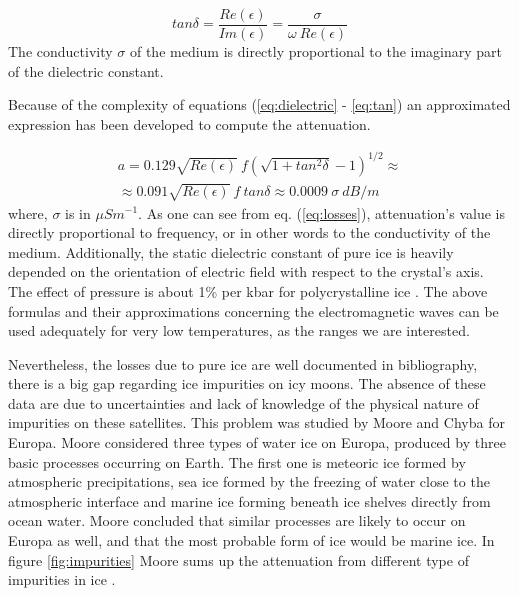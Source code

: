 \begin{equation}
    tan \delta=\frac{Re(\epsilon)}{Im(\epsilon)}=\frac{\sigma}{\omega\ Re(\epsilon)}
    \label{eq:tan}
\end{equation}
The conductivity $\sigma$ of the medium is directly proportional to the imaginary part of the dielectric constant.

Because of the complexity of equations (\ref{eq:dielectric} - \ref{eq:tan}) an approximated expression has been developed to compute the attenuation.

\begin{multline}
    a=0.129 \sqrt{Re(\epsilon)}\ f (\sqrt{1+tan^2 \delta}-1)^{1/2} \approx \\
    \approx 0.091 \sqrt{Re(\epsilon)}\ f\ tan \delta \approx 0.0009\ \sigma\ dB/m
    \label{eq:losses}
\end{multline}
where, $\sigma$ is in $\mu S m^{-1}$. As one can see from eq. (\ref{eq:losses}), attenuation's value is directly proportional to frequency, or in other words to the conductivity of the medium. Additionally, the static dielectric constant of pure ice is heavily depended on the orientation of electric field with respect to the crystal's axis. The effect of pressure is about 1\% per kbar for polycrystalline ice \cite{Kofman_2010}. The above formulas and their approximations concerning the electromagnetic waves can be used adequately for very low temperatures, as the ranges we are interested.

Nevertheless, the losses due to pure ice are well documented in bibliography, there is a big gap regarding ice impurities on icy moons. The absence of these data are due to uncertainties and lack of knowledge of the physical nature of impurities on these satellites. This problem was studied by  Moore \cite{Moore_2000} and Chyba \cite{Chyba_1998} for Europa. Moore considered three types of water ice on Europa, produced by three basic processes occurring on Earth. The first one is meteoric ice formed by atmospheric precipitations, sea ice formed by the freezing of water close to the atmospheric interface and marine ice forming beneath ice shelves directly from ocean water. Moore concluded that similar processes are likely to occur on Europa as well, and that the most probable form of ice would be marine ice. In figure \ref{fig:impurities} Moore sums up the attenuation from different type of impurities in ice \cite{Moore_2000}.

